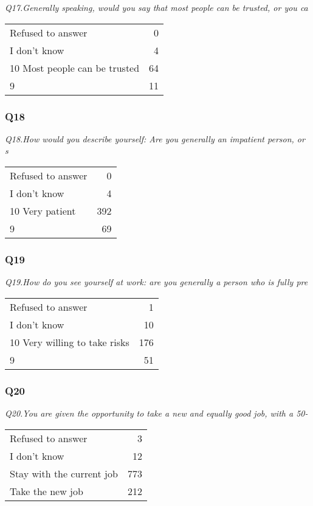\documentclass[
]{article}
\begin{document}
\textit{Q17.Generally speaking, would you say that most people can be trusted, or you ca}

\begin{longtable}[]{@{}lr@{}}
\toprule
\endhead
Refused to answer & 0\tabularnewline
I don't know & 4\tabularnewline
10 Most people can be trusted & 64\tabularnewline
9 & 11\tabularnewline
\bottomrule
\end{longtable}

\hypertarget{q18}{%
\subsubsection{Q18}\label{q18}}

\textit{Q18.How would you describe yourself: Are you generally an impatient person, or s}

\begin{longtable}[]{@{}lr@{}}
\toprule
\endhead
Refused to answer & 0\tabularnewline
I don't know & 4\tabularnewline
10 Very patient & 392\tabularnewline
9 & 69\tabularnewline
\bottomrule
\end{longtable}

\hypertarget{q19}{%
\subsubsection{Q19}\label{q19}}

\textit{Q19.How do you see yourself at work: are you generally a person who is fully pre}

\begin{longtable}[]{@{}lr@{}}
\toprule
\endhead
Refused to answer & 1\tabularnewline
I don't know & 10\tabularnewline
10 Very willing to take risks & 176\tabularnewline
9 & 51\tabularnewline
\bottomrule
\end{longtable}

\hypertarget{q20}{%
\subsubsection{Q20}\label{q20}}

\textit{Q20.You are given the opportunity to take a new and equally good job, with a 50-}

\begin{longtable}[]{@{}lr@{}}
\toprule
\endhead
Refused to answer & 3\tabularnewline
I don't know & 12\tabularnewline
Stay with the current job & 773\tabularnewline
Take the new job & 212\tabularnewline
\bottomrule
\end{longtable}
\end{document}
